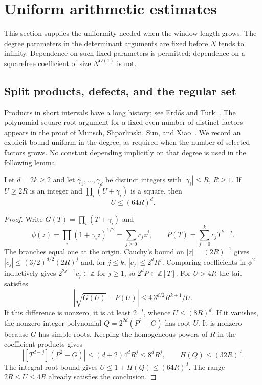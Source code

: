 \section{Uniform arithmetic estimates}
\label{p1:arith:appendix}

This section supplies the uniformity needed when the window length grows.
The degree parameters in the determinant arguments are fixed before $N$
tends to infinity.  Dependence on such fixed parameters is permitted;
dependence on a squarefree coefficient of size $N^{O(1)}$ is not.

\subsection{Split products, defects, and the regular set}

Products in short intervals have a long history; see
Erd\H{o}s and Turk~\cite{erdosturk1984}.  The polynomial square-root
argument for a fixed even number of distinct factors appears in the
proof of Munsch, Shparlinski, Sun, and Xiao~\cite[Lemma~3.3]{munsch2026}.
We record an explicit bound uniform in the degree, as required when the
number of selected factors grows.  No constant depending implicitly on
that degree is used in the following lemma.

\begin{lemma}\label{p1:arith:runge}
Let $d=2k\geq2$ and let $\gamma_1,\ldots,\gamma_d$ be distinct integers
with $|\gamma_i|\leq R$, $R\geq1$.  If $U\geq2R$ is an integer and
$\prod_i(U+\gamma_i)$ is a square, then
\[
 U\leq(64R)^d.
\]
\end{lemma}

\begin{proof}
Write $G(T)=\prod_i(T+\gamma_i)$ and
\[
 \phi(z)=\prod_i(1+\gamma_i z)^{1/2}=\sum_{j\geq0}c_jz^j,
 \qquad P(T)=\sum_{j=0}^k c_jT^{k-j}.
\]
The branches equal one at the origin.  Cauchy's bound on $|z|=(2R)^{-1}$
gives $|c_j|\leq(3/2)^{d/2}(2R)^j$ and, for $j\leq k$,
$|c_j|\leq2^dR^j$.  Comparing coefficients in $\phi^2$ inductively gives
$2^{2j-1}c_j\in\mathbb Z$ for $j\geq1$, so $2^dP\in\mathbb Z[T]$.
For $U>4R$ the tail satisfies
\[
 |\sqrt{G(U)}-P(U)|\leq4\,3^{d/2}R^{k+1}/U.
\]
If this difference is nonzero, it is at least $2^{-d}$, whence
$U\leq(8R)^d$.  If it vanishes, the nonzero integer polynomial
$Q=2^{2d}(P^2-G)$ has root $U$.  It is nonzero because $G$ has simple roots.
Keeping the homogeneous powers of $R$ in the coefficient products gives
\[
 |[T^{d-j}](P^2-G)|\leq(d+2)4^dR^j\leq8^dR^j,
 \qquad H(Q)\leq(32R)^d.
\]
The integral-root bound gives $U\leq1+H(Q)\leq(64R)^d$.
The range $2R\leq U\leq4R$ already satisfies the conclusion.
\end{proof}

